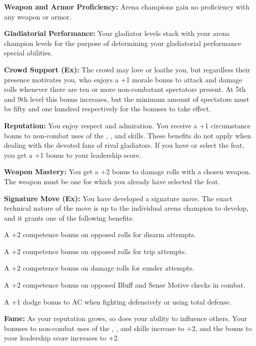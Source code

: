 {
\textbf{Weapon and Armor Proficiency:} Arena champions gain no proficiency with any weapon or armor.

\textbf{Gladiatorial Performance:} Your gladiator levels stack with your arena champion levels for the purpose of determining your gladiatorial performance special abilities.

\textbf{Crowd Support (Ex):} The crowd may love or loathe you, but regardless their presence motivates you, who enjoys a +1 morale bonus to attack and damage rolls whenever there are ten or more non-combatant spectators present. At 5th and 9th level this bonus increases, but the minimum amount of spectators must be fifty and one hundred respectively for the bonuses to take effect.

\textbf{Reputation:} You enjoy respect and admiration. You receive a +1 circumstance bonus to non-combat uses of the , ,  and  skills. These benefits do not apply when dealing with the devoted fans of rival gladiators. If you have or select the  feat, you get a +1 bonus to your leadership score.

\textbf{Weapon Mastery:} You get a +2 bonus to damage rolls with a chosen weapon. The weapon must be one for which you already have selected the  feat.

\textbf{Signature Move (Ex):} You have developed a signature move. The exact technical nature of the move is up to the individual arena champion to develop, and it grants one of the following benefits:
\begin{itemize*}
\item A +2 competence bonus on opposed rolls for disarm attempts.
\item A +2 competence bonus on opposed rolls for trip attempts.
\item A +2 competence bonus on damage rolls for sunder attempts.
\item A +2 competence bonus on opposed Bluff and Sense Motive checks in combat.
\item A +1 dodge bonus to AC when fighting defensively or using total defense.
\end{itemize*}

\textbf{Fame:} As your reputation grows, so does your ability to influence others. Your bonuses to non-combat uses of the , ,  and  skills increase to +2, and the bonus to your leadership score increases to +2.

}
